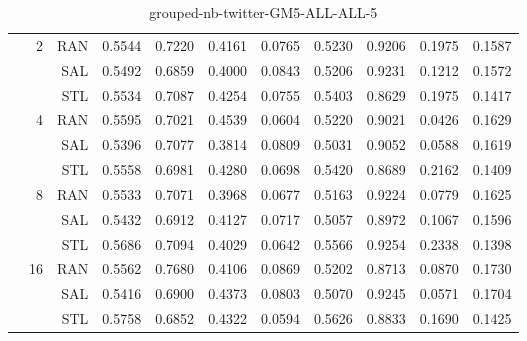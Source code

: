 \begin{center}
\begin{table}[htbp]
\begin{center}
\begin{tabular}{ | r | r | r | r | r | r | r | r | r | r | r |}
 & \multirow{3}{*}{2} & RAN & 0.5544 & 0.7220 & 0.4161 & 0.0765 & 0.5230 & 0.9206 & 0.1975 & 0.1587\\ \cline{3-11}
 &   & SAL & 0.5492 & 0.6859 & 0.4000 & 0.0843 & 0.5206 & 0.9231 & 0.1212 & 0.1572\\ \cline{3-11}
 &   & STL & 0.5534 & 0.7087 & 0.4254 & 0.0755 & 0.5403 & 0.8629 & 0.1975 & 0.1417\\ \cline{2-11}
 & \multirow{3}{*}{4} & RAN & 0.5595 & 0.7021 & 0.4539 & 0.0604 & 0.5220 & 0.9021 & 0.0426 & 0.1629\\ \cline{3-11}
 &   & SAL & 0.5396 & 0.7077 & 0.3814 & 0.0809 & 0.5031 & 0.9052 & 0.0588 & 0.1619\\ \cline{3-11}
 &   & STL & 0.5558 & 0.6981 & 0.4280 & 0.0698 & 0.5420 & 0.8689 & 0.2162 & 0.1409\\ \cline{2-11}
 & \multirow{3}{*}{8} & RAN & 0.5533 & 0.7071 & 0.3968 & 0.0677 & 0.5163 & 0.9224 & 0.0779 & 0.1625\\ \cline{3-11}
 &   & SAL & 0.5432 & 0.6912 & 0.4127 & 0.0717 & 0.5057 & 0.8972 & 0.1067 & 0.1596\\ \cline{3-11}
 &   & STL & 0.5686 & 0.7094 & 0.4029 & 0.0642 & 0.5566 & 0.9254 & 0.2338 & 0.1398\\ \cline{2-11}
 & \multirow{3}{*}{16} & RAN & 0.5562 & 0.7680 & 0.4106 & 0.0869 & 0.5202 & 0.8713 & 0.0870 & 0.1730\\ \cline{3-11}
 &   & SAL & 0.5416 & 0.6900 & 0.4373 & 0.0803 & 0.5070 & 0.9245 & 0.0571 & 0.1704\\ \cline{3-11}
 &   & STL & 0.5758 & 0.6852 & 0.4322 & 0.0594 & 0.5626 & 0.8833 & 0.1690 & 0.1425\\ \cline{2-11}
\hline
\end{tabular}
\caption{grouped-nb-twitter-GM5-ALL-ALL-5}
\end{center}
 \end{table}
\end{center}

